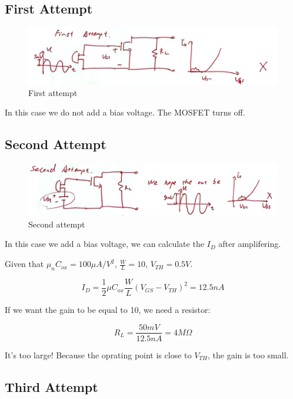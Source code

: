 \documentclass[fontset=windows]{article}
\begin{document}
\subsection*{First Attempt}

\begin{figure}[htbp]
    \centering
    \includegraphics[scale=0.6]{4.jpg}
    \captionsetup{labelformat=empty}
    \caption{First attempt}
    \label{4}
\end{figure}

In this case we do not add a bias voltage. The MOSFET turns off. 

\subsection*{Second Attempt}

\begin{figure}[htbp]
    \centering
    \includegraphics[scale=0.6]{5.jpg}
    \captionsetup{labelformat=empty}
    \caption{Second attempt}
    \label{5}
\end{figure}

In this case we add a bias voltage, we can calculate the $I_D$ after amplifering. 

Given that $\mu_nC_{ox}=100\mu A/V^2$, $\frac{W}{L}=10$, $V_{TH}=0.5V$. 

$$I_D=\frac{1}{2} \mu C_{ox}\frac{W}{L}(V_{GS}-V_{TH})^2=12.5nA$$

If we want the gain to be equal to 10, we need a resistor: 

$$R_L=\frac{50mV}{12.5nA}=4M\Omega$$

It's too large! Because the oprating point is close to $V_{TH}$, the gain is too small. 

\subsection*{Third Attempt}
\end{document}
